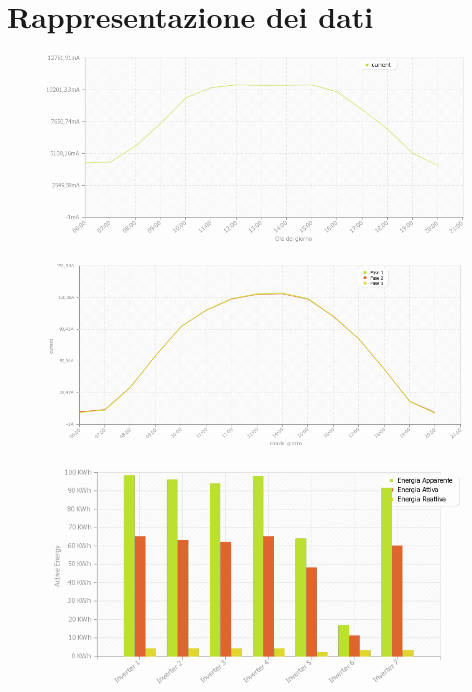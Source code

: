 \chapter{Rappresentazione dei dati}
\label{sec:datapresentation}

\begin{figure}[!h]
\centering
\includegraphics[width=400pt]{img/portale/corrente-stringa-giornaliera.png}
\end{figure}

\begin{figure}[!h]
\centering
\includegraphics[width=400pt]{img/portale/current-power-transponder.png}
\end{figure}

\begin{figure}[!h]
\centering
\includegraphics[width=400pt]{img/portale/energia-confronto-inverter.png}
\end{figure}



